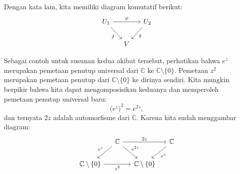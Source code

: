 \documentclass[12pt,openany]{book}
\newcommand{\C}{{\mathbb{C}}}
\theoremstyle{plain}
\theoremstyle{remark}
\theoremstyle{definition}
\theoremstyle{exercise}
\theoremstyle{example}
\begin{document}
Dengan kata lain, kita memiliki diagram komutatif berikut:
\begin{equation*}
\begin{tikzcd}[column sep=small]
U_1 \arrow[rr,"\varphi"] \arrow[dr,"f"'] & & U_2 \arrow[dl,"g"] \\
                               & V
\end{tikzcd}
\end{equation*}

Sebagai contoh untuk susunan kedua akibat tersebut,
perhatikan bahwa $e^z$ merupakan pemetaan penutup universal dari $\C$ ke $\C \setminus \{ 0 \}$.
Pemetaan $z^2$ merupakan pemetaan penutup dari $\C \setminus \{ 0 \}$ ke dirinya sendiri.
Kita mungkin berpikir bahwa kita dapat mengomposisikan keduanya dan memperoleh pemetaan penutup universal baru:
\begin{equation*}
{\bigl(e^z\bigr)}^2 = e^{2z} ,
\end{equation*}
dan ternyata $2z$ adalah automorfisme dari $\C$.  Karena kita sudah menggambar
diagram:
\begin{equation*}
\begin{tikzcd}[column sep=small]
& \C \arrow[dl,"e^z"'] \arrow[dr,"e^{2z}"] \arrow[rr,"2z"] & & \C \arrow[dl,"e^z"] \\
\C \setminus \{ 0 \} \arrow[rr,"z^2"'] & & \C \setminus \{ 0 \} 
\end{tikzcd}
\end{equation*}
\end{document}
